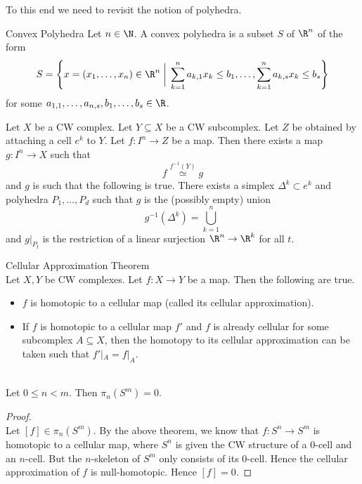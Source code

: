\documentclass[a4paper]{article}
\begin{document}
To this end we need to revisit the notion of polyhedra. 

\begin{defn}{Convex Polyhedra}{} Let $n\in\N$. A convex polyhedra is a subset $S$ of $\R^n$ of the form $$S=\left\{x=(x_1,\dots,x_n)\in\R^n\;\bigg{|}\;\sum_{k=1}^na_{k,1}x_k\leq b_1,\dots,\sum_{k=1}^n a_{k,s}x_k\leq b_s\right\}$$ for some $a_{1,1},\dots,a_{n,s},b_1,\dots,b_s\in\R$. 
\end{defn}

\begin{lmm}{}{} Let $X$ be a CW complex. Let $Y\subseteq X$ be a CW subcomplex. Let $Z$ be obtained by attaching a cell $e^k$ to $Y$. Let $f:I^n\to Z$ be a map. Then there exists a map $g:I^n\to X$ such that $$f\overset{f^{-1}(Y)}{\simeq} g$$ and $g$ is such that the following is true. There exists a simplex $\Delta^k\subset e^k$ and polyhedra $P_1,\dots,P_d$ such that $g$ is the (possibly empty) union $$g^{-1}(\Delta^k)=\bigcup_{k=1}^n$$ and $g|_{P_t}$ is the restriction of a linear surjection $\R^n\to\R^k$ for all $t$. 
\end{lmm}

\begin{thm}{Cellular Approximation Theorem}{}\\
Let $X,Y$ be CW complexes. Let $f:X\to Y$ be a map. Then the following are true. 
\begin{itemize}
\item $f$ is homotopic to a cellular map (called its cellular approximation). 
\item If $f$ is homotopic to a cellular map $f'$ and $f$ is already cellular for some subcomplex $A\subseteq X$, then the homotopy to its cellular approximation can be taken such that $f'|_A=f|_A$. 
\end{itemize}
\end{thm}

\begin{eg}{}{}\\
Let $0\leq n<m$. Then $\pi_n(S^m)=0$. 
\begin{proof}\\
Let $[f]\in\pi_n(S^m)$. By the above theorem, we know that $f:S^n\to S^m$ is homotopic to a cellular map, where $S^n$ is given the CW structure of a $0$-cell and an $n$-cell. But the $n$-skeleton of $S^m$ only consists of its $0$-cell. Hence the cellular approximation of $f$ is null-homotopic. Hence $[f]=0$. 
\end{proof}
\end{eg}
\end{document}
